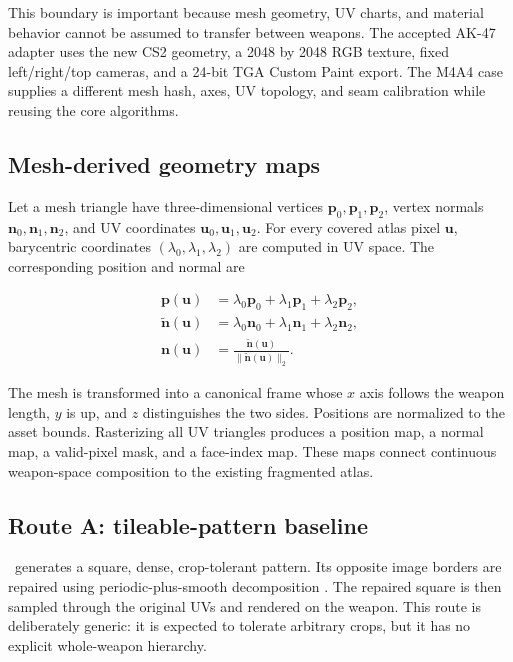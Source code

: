 This boundary is important because mesh geometry, UV charts, and material behavior
cannot be assumed to transfer between weapons. The accepted AK-47 adapter uses the
new CS2 geometry, a 2048 by 2048 RGB texture, fixed left/right/top cameras, and a
24-bit TGA Custom Paint export. The M4A4 case supplies a different mesh hash, axes,
UV topology, and seam calibration while reusing the core algorithms.

\subsection{Mesh-derived geometry maps}

Let a mesh triangle have three-dimensional vertices
$\mathbf{p}_0,\mathbf{p}_1,\mathbf{p}_2$, vertex normals
$\mathbf{n}_0,\mathbf{n}_1,\mathbf{n}_2$, and UV coordinates
$\mathbf{u}_0,\mathbf{u}_1,\mathbf{u}_2$. For every covered atlas pixel
$\mathbf{u}$, barycentric coordinates $(\lambda_0,\lambda_1,\lambda_2)$ are
computed in UV space. The corresponding position and normal are

\begin{align}
  \mathbf{p}(\mathbf{u}) &=
  \lambda_0\mathbf{p}_0+\lambda_1\mathbf{p}_1+\lambda_2\mathbf{p}_2,\\
  \tilde{\mathbf{n}}(\mathbf{u}) &=
  \lambda_0\mathbf{n}_0+\lambda_1\mathbf{n}_1+\lambda_2\mathbf{n}_2,\\
  \mathbf{n}(\mathbf{u}) &= \frac{\tilde{\mathbf{n}}(\mathbf{u})}
  {\lVert\tilde{\mathbf{n}}(\mathbf{u})\rVert_2}.
\end{align}

The mesh is transformed into a canonical frame whose $x$ axis follows the weapon
length, $y$ is up, and $z$ distinguishes the two sides. Positions are normalized
to the asset bounds. Rasterizing all UV triangles produces a position map, a
normal map, a valid-pixel mask, and a face-index map. These maps connect continuous
weapon-space composition to the existing fragmented atlas.

\subsection{Route A: tileable-pattern baseline}

\routeA\ generates a square, dense, crop-tolerant pattern. Its opposite image
borders are repaired using periodic-plus-smooth decomposition
\citep{moisan2011periodic}. The repaired square is then sampled through the
original UVs and rendered on the weapon. This route is deliberately generic: it
is expected to tolerate arbitrary crops, but it has no explicit whole-weapon
hierarchy.


